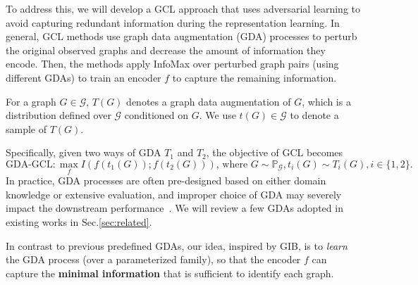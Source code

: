 To address this, we will develop a GCL approach that uses adversarial learning to  avoid capturing redundant information during the representation learning. 
In general, GCL methods use graph data augmentation (GDA) processes to perturb the original observed graphs and decrease the amount of information they encode. %
Then, the methods apply InfoMax over perturbed graph pairs (using different GDAs) to train an encoder $f$ to capture the remaining information. 
\begin{definition}
For a graph $G \in \mathcal{G}$, $T(G)$ denotes a graph data augmentation of $G$, which is a distribution defined over $\mathcal{G}$ conditioned on $G$. We use $t(G)\in \mathcal{G}$ to denote a sample of $T(G)$. 
\end{definition}\vspace{-2mm}
Specifically, given two ways of GDA $T_1$ and $T_2$, the objective of GCL becomes
\begin{equation} \label{eq:gcl-fix-aug}
  \text{GDA-GCL:}\,  \max_{f} I(f(t_1(G)) ; f(t_2(G))), \, \text{where } G\sim \mathbb{P}_{\mathcal{G}}, t_i(G)\sim T_i(G), i\in\{1,2\}.
\end{equation}
In practice, GDA processes are often pre-designed based on either domain knowledge or extensive evaluation, and improper choice of GDA may severely impact the downstream performance~\cite{you2020graph,hu2019strategies}. %
 We will review a few GDAs adopted in existing works in Sec.\ref{sec:related}. 
 
 In contrast to previous predefined GDAs, our idea, inspired by GIB, is to {\em learn} the GDA process (over a parameterized family), so that the encoder $f$ can capture the \textbf{minimal information } that is sufficient to identify each graph. %
 
\vspace{-1mm}

